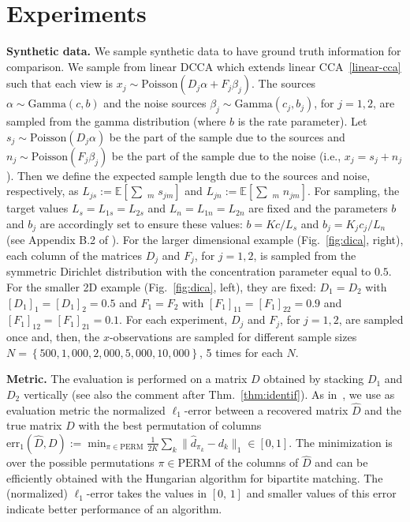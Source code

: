 \documentclass{article}
\newcommand{\ppp}{\textbf}
\newcommand{\cbra}[1]{\left\{#1\right\}}
\newcommand{\wh}[1]{\widehat{#1}}
\newcommand{\ebb}{\mathbb{E}}
\newcommand{\poi}{\mathrm{Poisson}}
\newcommand{\gam}{\mathrm{Gamma}}
\begin{document}
\section{Experiments}\label{sec:experiments}

\ppp{Synthetic data.} 
We sample synthetic data to have ground truth information for comparison.
We sample from linear DCCA which extends linear CCA~\eqref{linear-cca} such that each view is $x_j \sim \poi (D_j \alpha + F_j \beta_j )$. The sources $\alpha \sim \gam(c,b)$ and the noise sources $\beta_j \sim \gam(c_j,b_j)$, for $j=1,2$, are sampled from the gamma distribution (where $b$ is the rate parameter). Let $s_j \sim \poi(D_j \alpha)$ be the part of the sample due to the sources and $n_j \sim \poi(F_j\beta_j)$ be the part of the sample due to the noise (i.e., $x_j = s_j + n_j$). Then we define the expected sample length due to the sources and noise, respectively, as $L_{js} := \ebb[\sum\mathop{}_{m} s_{jm}]$ and $L_{jn} := \ebb[ \sum\mathop{}_{m} n_{jm}]$. For sampling, the target values $L_s = L_{1s} = L_{2s}$ and $L_n = L_{1n} = L_{2n}$ are fixed and the parameters $b$ and $b_j$ are accordingly set to ensure these values: $b= Kc / L_s$ and $b_j = K_j c_j / L_n$ (see Appendix B.2 of \citet{PodEtAl2015}). For the larger dimensional example (Fig.~\ref{fig:dica}, right), each column of the matrices $D_j$ and $F_j$, for $j=1,2$, is sampled from the symmetric Dirichlet distribution with the concentration parameter equal to $0.5$. For the smaller 2D example (Fig.~\ref{fig:dica}, left), they are fixed: $D_1=D_2$ with $[D_1]_1=[D_1]_2=0.5$ and $F_1=F_2$ with $[F_1]_{11}=[F_1]_{22}=0.9$ and $[F_1]_{12} = [F_1]_{21}=0.1$.
For each experiment, $D_j$ and $F_j$, for $j=1,2$, are sampled once and, then, the $x$-observations are sampled for different sample sizes $N = \cbra{ 500, 1,000, 2,000, 5,000, 10,000}$, 5 times for each $N$.

\ppp{Metric.} The evaluation is performed on a matrix $D$ obtained by stacking $D_1$ and $D_2$ vertically (see also the comment after Thm.~\ref{thm:identif}). As in~\citet{PodEtAl2015}, we use as evaluation metric the normalized $\ell_1$-error between a recovered matrix $\wh{D}$ and the true matrix $D$ with the best permutation of columns $\mathrm{err}_1(\wh{D},D):=\min_{\pi\in\mathrm{PERM}} \frac{1}{2K} \sum_k \|{ \wh{d}_{\pi_k} - d_k }\|_1 \in [0,1]$. The minimization is over the possible permutations $\pi\in\mathrm{PERM}$ of the columns of $\wh{D}$ and can be efficiently obtained with the Hungarian algorithm for bipartite matching. The (normalized) $\ell_1$-error takes the values in $[0,\,1]$ and smaller values of this error indicate better performance of an algorithm.
\end{document}
